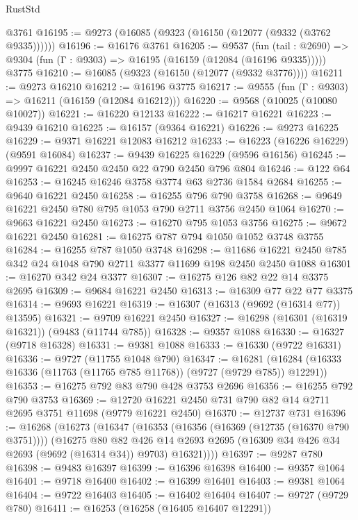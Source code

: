 \begin{lexlean}{RustStd}
\begin{coremodule}
    @3761
@16195 := @9273 (@16085 (@9323 (@16150 (@12077 (@9332 (@3762 @9335))))))
@16196 := @16176 @3761
@16205 := @9537
    (fun (tail : @2690) => @9304 (fun (Γ : @9303) => @16195 (@16159 (@12084 (@16196 @9335)))))
    @3775
@16210 := @16085 (@9323 (@16150 (@12077 (@9332 @3776))))
@16211 := @9273 @16210
@16212 := @16196 @3775
@16217 := @9555 (fun (Γ : @9303) => @16211 (@16159 (@12084 @16212)))
@16220 := @9568 (@10025 (@10080 @10027))
@16221 := @16220 @12133
@16222 := @16217 @16221
@16223 := @9439 @16210
@16225 := @16157 (@9364 @16221)
@16226 := @9273 @16225
@16229 := @9371 @16221 @12083 @16212
@16233 := @16223 (@16226 @16229) (@9591 @16084)
@16237 := @9439 @16225 @16229 (@9596 @16156)
@16245 := @9997 @16221 @2450 @2450 @22 @790 @2450 @796 @804
@16246 := @122 @64
@16253 := @16245 @16246 @3758 @3774 @63 @2736 @1584 @2684
@16255 := @9640 @16221 @2450
@16258 := @16255 @796 @790 @3758
@16268 := @9649 @16221 @2450 @780 @795 @1053 @790 @2711 @3756 @2450 @1064
@16270 := @9663 @16221 @2450
@16273 := @16270 @795 @1053 @3756
@16275 := @9672 @16221 @2450
@16281 := @16275 @787 @794 @1050 @1052 @3748 @3755
@16284 := @16255 @787 @1050 @3748
@16298 := @11686 @16221 @2450 @785 @342 @24 @1048 @790 @2711 @3377 @11699 @198 @2450 @2450 @1088
@16301 := @16270 @342 @24 @3377
@16307 := @16275 @126 @82 @22 @14 @3375 @2695
@16309 := @9684 @16221 @2450
@16313 := @16309 @77 @22 @77 @3375
@16314 := @9693 @16221
@16319 := @16307 (@16313 (@9692 (@16314 @77)) @13595)
@16321 := @9709 @16221 @2450
@16327 := @16298 (@16301 (@16319 @16321)) (@9483 (@11744 @785))
@16328 := @9357 @1088
@16330 := @16327 (@9718 @16328)
@16331 := @9381 @1088
@16333 := @16330 (@9722 @16331)
@16336 := @9727 (@11755 @1048 @790)
@16347 := @16281 (@16284 (@16333 @16336 (@11763 (@11765 @785 @11768)) (@9727 (@9729 @785)) @12291))
@16353 := @16275 @792 @83 @790 @428 @3753 @2696
@16356 := @16255 @792 @790 @3753
@16369 := @12720 @16221 @2450 @731 @790 @82 @14 @2711 @2695 @3751 @11698 (@9779 @16221 @2450)
@16370 := @12737 @731
@16396 := @16268
    (@16273
      (@16347
        (@16353
          (@16356 (@16369 (@12735 (@16370 @790 @3751))))
          (@16275
            @80
            @82
            @426
            @14
            @2693
            @2695
            (@16309 @34 @426 @34 @2693 (@9692 (@16314 @34)) @9703)
            @16321))))
@16397 := @9287 @780
@16398 := @9483 @16397
@16399 := @16396 @16398
@16400 := @9357 @1064
@16401 := @9718 @16400
@16402 := @16399 @16401
@16403 := @9381 @1064
@16404 := @9722 @16403
@16405 := @16402 @16404
@16407 := @9727 (@9729 @780)
@16411 := @16253 (@16258 (@16405 @16407 @12291))

\end{coremodule}
\end{lexlean}
